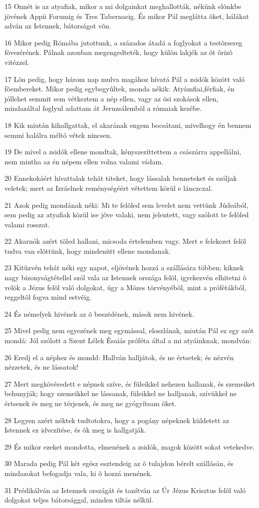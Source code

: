 \par 15 Onnét is az atyafiak, mikor a mi dolgainkat meghallották, nékünk elõnkbe jövének Appii Forumig és Tres Tabernaeig. És mikor Pál meglátta õket, hálákat adván az Istennek, bátorságot võn.
\par 16 Mikor pedig Rómába jutottunk, a százados átadá a foglyokat a testõrsereg fõvezérének. Pálnak azonban megengedteték, hogy külön lakjék az õt õrizõ vitézzel.
\par 17 Lõn pedig, hogy három nap mulva magához hívatá Pál a zsidók között való fõembereket. Mikor pedig egybegyûltek, monda nékik: Atyámfiai,férfiak, én jóllehet semmit sem vétkeztem a nép ellen, vagy az õsi szokások ellen, mindazáltal foglyul adattam át Jeruzsálembõl a rómaiak kezébe.
\par 18 Kik miután kihallgattak, el akarának engem bocsátani, mivelhogy én bennem semmi halálra méltó vétek nincsen.
\par 19 De mivel a zsidók ellene mondtak, kényszeríttettem a császárra appellálni, nem mintha az én népem ellen volna valami vádam.
\par 20 Ennekokáért hívattalak tehát titeket, hogy lássalak benneteket és szóljak veletek; mert az Izráelnek reménységéért vétettem körül e lánczczal.
\par 21 Azok pedig mondának néki: Mi te felõled sem levelet nem vettünk Júdeából, sem pedig az atyafiak közül ise jõve valaki, nem jelentett, vagy szólott te felõled valami rosszat.
\par 22 Akarnók azért tõled hallani, micsoda értelemben vagy. Mert e felekezet felõl tudva van elõttünk, hogy mindenütt  ellene mondanak.
\par 23 Kitûzvén tehát néki egy napot, eljövének hozzá a szállására többen; kiknek nagy bizonyságtétellel szól vala az Istennek országa felõl, igyekezvén elhitetni õ velök a Jézus felõl való dolgokat, úgy a Mózes törvényébõl, mint a prófétákból, reggeltõl fogva mind estvéig.
\par 24 És némelyek hivének az õ beszédének, mások nem hivének.
\par 25 Mivel pedig nem egyezének meg egymással, eloszlának, miután Pál ez egy szót mondá: Jól szólott a Szent Lélek Ésaiás próféta által a mi atyáinknak, mondván:
\par 26 Eredj el a néphez és mondd: Hallván halljátok, és ne értsetek; és nézvén nézzetek, és ne lássatok!
\par 27 Mert megkövéredett e népnek szíve, és füleikkel nehezen hallanak, és szemeiket behunyják; hogy szemeikkel ne lássanak, füleikkel ne halljanak, szívükkel ne értsenek és meg ne térjenek, és meg ne gyógyítsam õket.
\par 28 Legyen azért néktek tudtotokra, hogy a pogány népeknek küldetett az Istennek ez idvezítése, és õk meg is hallgatják.
\par 29 És mikor ezeket mondotta, elmenének a zsidók, magok között sokat vetekedve.
\par 30 Marada pedig Pál két egész esztendeig az õ tulajdon bérelt szállásán, és mindazokat befogadja vala, ki õ hozzá menének.
\par 31 Prédikálván az Istennek országát és tanítván az Úr Jézus Krisztus felõl való dolgokat teljes bátorsággal, minden tiltás nélkül.



